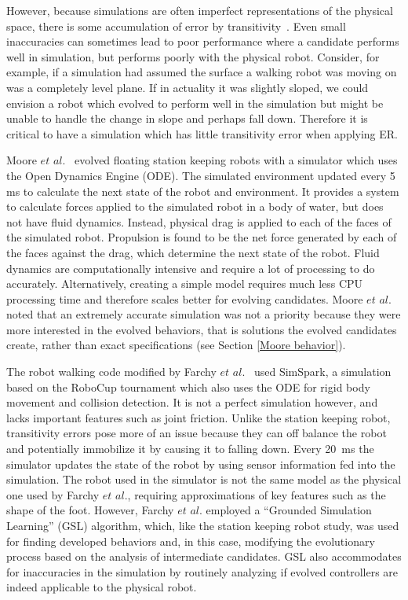 \documentclass{sig-alternate}
\begin{document}
However, because simulations are often imperfect representations of the physical space, there is some accumulation of error by transitivity~\cite{Farchy:2013:HRL:2484920.2484930}. Even small inaccuracies can sometimes lead to poor performance where a candidate performs well in simulation, but performs poorly with the physical robot. Consider, for example, if a simulation had assumed the surface a walking robot was moving on was a completely level plane. If in actuality it was slightly sloped, we could envision a robot which evolved to perform well in the simulation but might be unable to handle the change in slope and perhaps fall down. Therefore it is critical to have a simulation which has little transitivity error when applying ER.

 Moore $et$ $al.$~\cite{Moore:2013:ESK:2463372.2463402} evolved floating station keeping robots with a simulator which uses the Open Dynamics Engine (ODE). The simulated environment updated every 5 ms to calculate the next state of the robot and environment. It provides a system to calculate forces applied to the simulated robot in a body of water, but does not have fluid dynamics. Instead, physical drag is applied to each of the faces of the simulated robot. Propulsion is found to be the net force generated by each of the faces against the drag, which determine the next state of the robot. Fluid dynamics are computationally intensive and require a lot of processing to do accurately. Alternatively, creating a simple model requires much less CPU processing time and therefore scales better for evolving candidates. Moore $et$ $al.$ noted that an extremely accurate simulation was not a priority because they were more interested in the evolved behaviors, that is solutions the evolved candidates create, rather than exact specifications (see Section \ref{Moore behavior}).
 
 The robot walking code modified by Farchy $et$ $al.$~\cite{Farchy:2013:HRL:2484920.2484930} used SimSpark, a simulation based on the RoboCup tournament which also uses the ODE for rigid body movement and collision detection. It is not a perfect simulation however, and lacks important features such as joint friction. Unlike the station keeping robot, transitivity errors pose more of an issue because they can off balance the robot and potentially immobilize it by causing it to falling down. Every 20~ms the simulator updates the state of the robot by using sensor information  fed into the simulation. The robot used in the simulator is not the same model as the physical one used by Farchy $et$ $al.$, requiring approximations of key features such as the shape of the foot. However, Farchy $et$ $al.$ employed a ``Grounded Simulation Learning'' (GSL) algorithm, which, like the station keeping robot study, was used for finding developed behaviors and, in this case, modifying the evolutionary process based on the analysis of intermediate candidates. GSL also accommodates for inaccuracies in the simulation by routinely analyzing if evolved controllers are indeed applicable to the physical robot.
 
\end{document}
